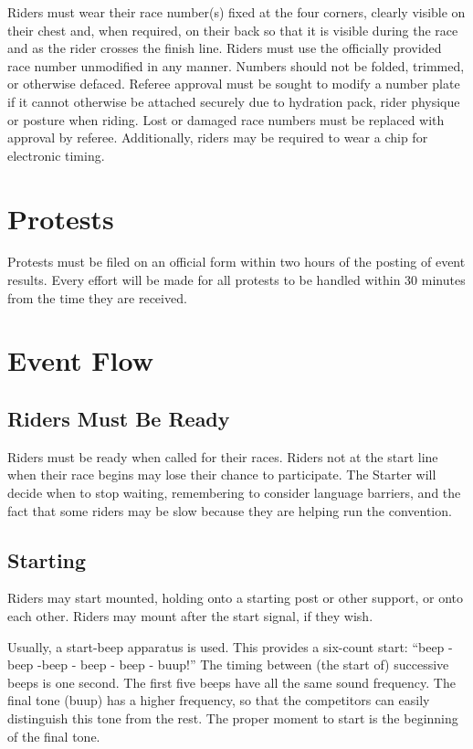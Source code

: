 Riders must wear their race number(s) fixed at the four corners, clearly visible on their chest and, when required, on their back so that it is visible during the race and as the rider crosses the finish line.
Riders must use the officially provided race number unmodified in any manner.
Numbers should not be folded, trimmed, or otherwise defaced.
Referee approval must be sought to modify a number plate if it cannot otherwise be attached securely due to hydration pack, rider physique or posture when riding.
Lost or damaged race numbers must be replaced with approval by referee.
Additionally, riders may be required to wear a chip for electronic timing.

\section{Protests}

Protests must be filed on an official form within two hours of the posting of event results.
Every effort will be made for all protests to be handled within 30 minutes from the time they are received.

\section{Event Flow}

\subsection{Riders Must Be Ready}

Riders must be ready when called for their races.
Riders not at the start line when their race begins may lose their chance to participate.
The Starter will decide when to stop waiting, remembering to consider language barriers, and the fact that some riders may be slow because they are helping run the convention.

\subsection{Starting}

Riders may start mounted, holding onto a starting post or other support, or onto each other.
Riders may mount after the start signal, if they wish.

Usually, a start-beep apparatus is used.
This provides a six-count start: ``beep - beep -beep - beep - beep - buup!''
The timing between (the start of) successive beeps is one second.
The first five beeps have all the same sound frequency.
The final tone (buup) has a higher frequency, so that the competitors can easily distinguish this tone from the rest.
The proper moment to start is the beginning of the final tone.

